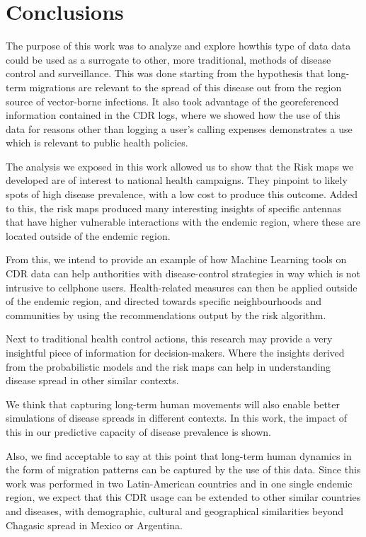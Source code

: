 \chapter{Conclusions}\label{ch:conclusions}


The purpose of this work was to analyze and explore howthis type of data data could be used as a surrogate to other, more traditional, methods of disease control and surveillance.
This was done starting from the hypothesis that long-term migrations 
are relevant to the spread of this disease out from the region source of vector-borne infections.
It also took advantage of the georeferenced information contained in the CDR logs, where we showed how the use of this data for reasons other than logging a user's calling expenses demonstrates a use which is relevant to public health policies. 


The analysis we exposed in this work allowed us to show that the Risk maps we developed are of interest to national health campaigns.
They pinpoint to likely spots of high disease prevalence, with a low cost to produce this outcome.
Added to this, the risk maps produced many interesting insights of specific antennas that have higher vulnerable interactions with the endemic region, where these are located outside of the endemic region.



From this, we intend to provide an example of how Machine Learning tools on CDR data can help authorities with disease-control strategies in way which is not intrusive to cellphone users.
Health-related measures can then be applied outside of the endemic region, and directed towards specific neighbourhoods and communities by using the recommendations output by the risk algorithm.

Next to traditional health control actions, this research may provide a very insightful piece of information for decision-makers.
Where the insights derived from the probabilistic models and the risk maps can help in understanding disease spread in other similar contexts.


We think that capturing long-term human movements will also enable better simulations of disease spreads in different contexts.
In this work, the impact of this in our predictive capacity of disease prevalence is shown.


Also, we find acceptable to say at this point that long-term human dynamics in the form of migration patterns can be captured by the use of this data.
Since this work was performed in two Latin-American countries and in one single endemic region, we expect that this CDR usage can be extended to other similar countries and diseases, with demographic, cultural and geographical similarities beyond Chagasic spread in Mexico or Argentina.



